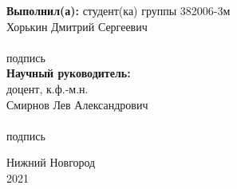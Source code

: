 \begin{titlepage}
\begin{minipage}[t]{.36\linewidth}
\begin{flushleft}
			\textbf{Выполнил(а):} студент(ка) группы 382006-3м \\
			Хорькин Дмитрий Сергеевич\\
			\vspace{1.0em}
			\hrulefill  \\
			{\small подпись}\\
			
			\vspace{1.5em}
			\textbf{Научный руководитель:}\\
		доцент, к.ф.-м.н.\\
			Смирнов Лев Александрович\\
			\vspace{1.0em}
			\hrulefill  \\
			{\small подпись}
			
    	\end{flushleft}
    \end{minipage}

	\vspace{\fill}

	\begin{center}
		Нижний Новгород \\
		2021
	\end{center}

\end{titlepage}